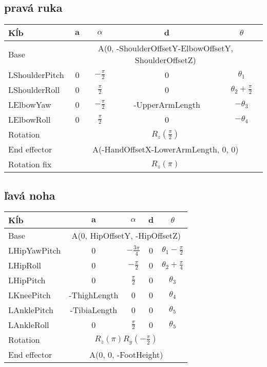 \subsection{pravá ruka}
\begin{center}
	\begin{tabular}{|l|c|c|c|c|}
	\hline
	\textbf{Kĺb} & $\textbf{a}$ & $\mathbb{\alpha}$ & $\textbf{d}$ & $\theta$ \\
	\hline
	Base & \multicolumn{4}{|c|}{A(0, -ShoulderOffsetY-ElbowOffsetY, ShoulderOffsetZ)} \\
	\hline
	LShoulderPitch & 0 & $-\frac{\pi}{2}$ & 0 & $\theta_1$ \\
	\hline
	LShoulderRoll & 0 & $\frac{\pi}{2}$ & 0 & $\theta_2 + \frac{\pi}{2}$ \\
	\hline
	LElbowYaw & 0 & $-\frac{\pi}{2}$ & -UpperArmLength & $-\theta_3$ \\
	\hline
	LElbowRoll & 0 & $\frac{\pi}{2}$ & 0 & $-\theta_4$ \\
	\hline
	Rotation & \multicolumn{4}{|c|}{$R_z\left(\frac{\pi}{2}\right)$} \\
	\hline
	End effector & \multicolumn{4}{|c|}{A(-HandOffsetX-LowerArmLength, 0, 0)} \\
	\hline
	Rotation fix & \multicolumn{4}{|c|}{$R_z\left(\pi\right)$} \\
	\hline
	\end{tabular}
\end{center}

\subsection{ľavá noha}
\begin{center}
	\begin{tabular}{|l|c|c|c|c|}
	\hline
	\textbf{Kĺb} & $\textbf{a}$ & $\mathbb{\alpha}$ & $\textbf{d}$ & $\theta$ \\
	\hline
	Base & \multicolumn{4}{|c|}{A(0, HipOffsetY, -HipOffsetZ)} \\
	\hline
	LHipYawPitch & 0 & $-\frac{3\pi}{4}$ & 0 & $\theta_1 - \frac{\pi}{2}$ \\
	\hline
	LHipRoll & 0 & $-\frac{\pi}{2}$ & 0 &  $\theta_2 + \frac{\pi}{4}$ \\
	\hline
	LHipPitch & 0 & $\frac{\pi}{2}$ & 0 & $\theta_3$ \\
	\hline
	LKneePitch & -ThighLength & 0 & 0 & $\theta_4$ \\
	\hline 
	LAnklePitch & -TibiaLength & 0 & 0 & $\theta_5$ \\
	\hline
	LAnkleRoll & 0 & $\frac{\pi}{2}$ & 0 & $\theta_5$ \\
	\hline
	Rotation & \multicolumn{4}{|c|}{$R_z\left(\pi\right)R_y\left(-\frac{\pi}{2}\right)$} \\
	\hline
	End effector & \multicolumn{4}{|c|}{A(0, 0, -FootHeight)} \\
	\hline
	\end{tabular}
\end{center}

